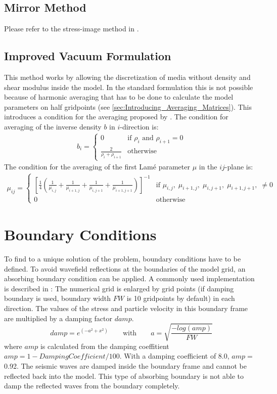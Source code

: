 \documentclass[pdftex,a4paper,parskip,listof=totoc,bibliography=totoc,onehalfspacing,12pt]{scrreprt}
\begin{document}
\subsection{Mirror Method}
Please refer to the stress-image method in \cite{levander1988fourth}.

\subsection{Improved Vacuum Formulation}
This method works by allowing the discretization of media without density and shear modulus inside the model. In the standard formulation this is not possible because of harmonic averaging that has to be done to calculate the model parameters on half gridpoints (see \ref{sec:Introducing_Averaging_Matrices}). This introduces a condition for the averaging proposed by \cite{zeng2012improved}. The condition for averaging of the inverse density $b$ in $i$-direction is:
\begin{align}
 b_i = \begin{cases}
        0 & \text{if }\rho_i\text{ and }\rho_{i+1}=0\\
        \frac{2}{\rho_i+\rho_{i+1}} & \text{otherwise}
       \end{cases}
\end{align}
The condition for the averaging of the first Lam\'e parameter $\mu$ in the $ij$-plane is:
\begin{align}
 \mu_{ij} = \begin{cases}
        \left[\frac{1}{4}\left(\frac{1}{\mu_{i,j}}+\frac{1}{\mu_{i+1,j}}+\frac{1}{\mu_{i,j+1}}+\frac{1}{\mu_{i+1,j+1}}\right)\right]^{-1} & \text{if }\mu_{i,j},\;\mu_{i+1,j},\;\mu_{i,j+1},\;\mu_{i+1,j+1},\;\neq 0\\
        0 & \text{otherwise}
       \end{cases}
\end{align}




\section{Boundary Conditions}
To find to a unique solution of the problem, boundary conditions have to be defined. 
To avoid wavefield reflections at the boundaries of the model grid, an absorbing boundary condition can be applied. A commonly used implementation is described in \cite{cerjan1985nonreflecting}: The numerical grid is enlarged by grid points (if damping boundary is used, boundary width $FW$  is 10 gridpoints by default) in each direction. The values of the stress and particle velocity in this boundary frame are multiplied by a damping factor $damp$.
\begin{equation}
	damp= e^{\left(-a^2+x^2\right)} \qquad \text{with} \qquad a= \sqrt{\frac{-log(amp)}{FW}}
\end{equation}
where $amp$ is calculated from the damping coeffitient $amp= 1-{DampingCoefficient}/{100}$. With a damping coefficient of \SI{8.0}{}, $amp=$ \SI{0.92}{}. The seismic waves are damped inside the boundary frame and cannot be reflected back into the model. This type of absorbing boundary is not able to damp the reflected waves from the boundary completely.
\end{document}
